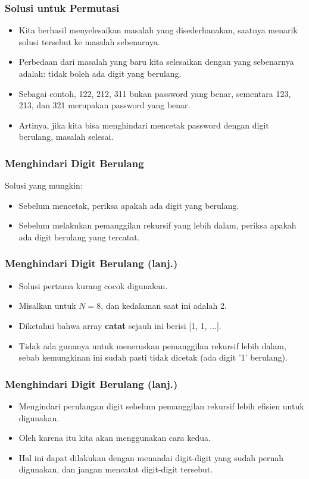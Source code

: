 \begin{frame}[fragile]
\frametitle{Solusi untuk Permutasi}
\begin{itemize}
  \item Kita berhasil menyelesaikan masalah yang disederhanakan, saatnya menarik solusi tersebut ke masalah sebenarnya.
  \item Perbedaan dari masalah yang baru kita selesaikan dengan yang sebenarnya adalah: tidak boleh ada digit yang berulang.
  \item Sebagai contoh, 122, 212, 311 bukan password yang benar, sementara 123, 213, dan 321 merupakan password yang benar.
  \item Artinya, jika kita bisa menghindari mencetak password dengan digit berulang, masalah selesai.
\end{itemize}
\end{frame}

\begin{frame}[fragile]
\frametitle{Menghindari Digit Berulang}
Solusi yang mungkin:
\begin{itemize}
  \item Sebelum mencetak, periksa apakah ada digit yang berulang.
  \item Sebelum melakukan pemanggilan rekursif yang lebih dalam, periksa apakah ada digit berulang yang tercatat.
\end{itemize}   
\end{frame}

\begin{frame}[fragile]
\frametitle{Menghindari Digit Berulang (lanj.)}
\begin{itemize}
  \item Solusi pertama kurang cocok digunakan.
  \item Misalkan untuk $N=8$, dan kedalaman saat ini adalah 2. 
  \item Diketahui bahwa array \textbf{catat} sejauh ini berisi [1, 1, ...].
  \item Tidak ada gunanya untuk meneruskan pemanggilan rekursif lebih dalam, sebab kemungkinan ini sudah pasti tidak dicetak (ada digit '1' berulang).
\end{itemize}   
\end{frame}

\begin{frame}
\frametitle{Menghindari Digit Berulang (lanj.)}
\begin{itemize}
  \item Mengindari perulangan digit sebelum pemanggilan rekursif lebih efisien untuk digunakan.
  \item Oleh karena itu kita akan menggunakan cara kedua.
  \item Hal ini dapat dilakukan dengan menandai digit-digit yang sudah pernah digunakan, dan jangan mencatat digit-digit tersebut.
\end{itemize}   
\end{frame}

